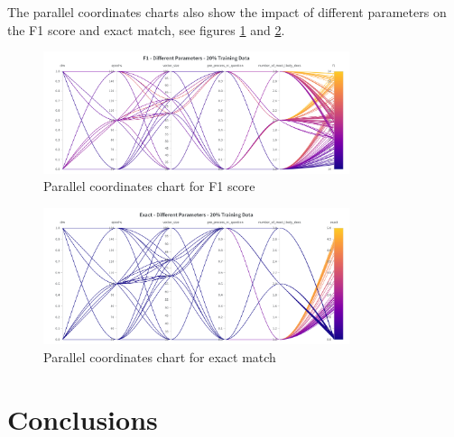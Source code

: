 \documentclass[11pt]{article}
\begin{document}
    The parallel coordinates charts also show the impact of different parameters on the F1 score and
    exact match, see figures \ref{fig:parallel-coordinates-f1} and \ref{fig:parallel-coordinates-exact-match}.

    \begin{figure}[h]
        \centering
        \includegraphics[width=0.8\textwidth]{parallel-coordinates-F1}
        \caption{Parallel coordinates chart for F1 score}
        \label{fig:parallel-coordinates-f1}
    \end{figure}

    \begin{figure}[h]
        \centering
        \includegraphics[width=0.8\textwidth]{parallel-coordinates-exact-match}
        \caption{Parallel coordinates chart for exact match}
        \label{fig:parallel-coordinates-exact-match}
    \end{figure}


    \section{Conclusions}\label{sec:conclusions}
\end{document}
